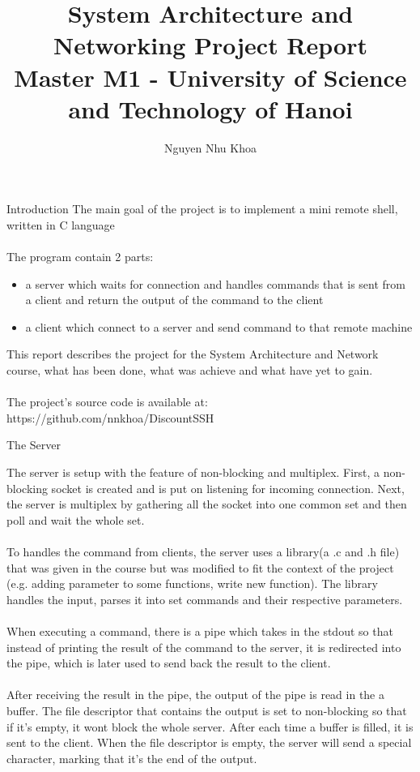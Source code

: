 \documentclass{report}
\title{
	{System Architecture and Networking Project Report}\\
	{\large Master M1 - University of Science and Technology of Hanoi}
}
\author{Nguyen Nhu Khoa}
\begin{document}
\maketitle
\begin{section}{Introduction}
The main goal of the project is to implement a mini remote shell, written in C language
\\
\\
The program contain 2 parts:

\begin{itemize}
	\item a server which waits for connection and handles commands that is sent from a client and return the output of the command to the client
	\item a client which connect to a server and send command to that remote machine 
\end{itemize}

This report describes the project for the System Architecture and Network course, what has been done, what was achieve and what have yet to gain.
\\
\\
The project's source code is available at: https://github.com/nnkhoa/DiscountSSH
\end{section}

\begin{section}{The Server}

The server is setup with the feature of non-blocking and multiplex. First, a non-blocking socket is created and is put on listening for incoming connection. Next, the server is multiplex by gathering all the socket into one common set and then poll and wait the whole set.
\\
\\
To handles the command from clients, the server uses a library(a .c and .h file) that was given in the course but was modified to fit the context of the project (e.g. adding parameter to some functions, write new function). The library handles the input, parses it into set commands and their respective parameters.
\\
\\
When executing a command, there is a pipe which takes in the stdout so that instead of printing the result of the command to the server, it is redirected into the pipe, which is later used to send back the result to the client.
\\
\\
After receiving the result in the pipe, the output of the pipe is read in the a buffer. The file descriptor that contains the output is set to non-blocking so that if it's empty, it wont block the whole server. After each time a buffer is filled, it is sent to the client. When the file descriptor is empty, the server will send a special character, marking that it's the end of the output.

\end{section}
\end{document}
